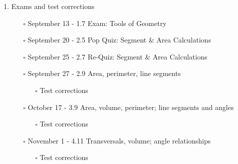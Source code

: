 \documentclass[12pt, twoside]{article}
\begin{document}
\begin{enumerate}
  \item Exams and test corrections
    \begin{itemize}
      \item[$\square$] September 13 - 1.7 Exam: Tools of Geometry
      \item[$\square$] September 20 - 2.5 Pop Quiz: Segment \& Area Calculations
      \item[$\square$] September 25 - 2.7 Re-Quiz: Segment \& Area Calculations
      \item[$\square$] September 27 - 2.9 Area, perimeter, line segments
        \begin{itemize} 
          \item[$\square$] Test corrections
        \end{itemize}
      \item[$\square$] October 17 - 3.9 Area, volume, perimeter; line segments and angles
      \begin{itemize} 
        \item[$\square$] Test corrections
      \end{itemize}
     \item[$\square$] November 1 - 4.11 Transversals, volume; angle relationships
     \begin{itemize} 
      \item[$\square$] Test corrections
    \end{itemize}
\end{itemize}

\end{enumerate}
\end{document}
